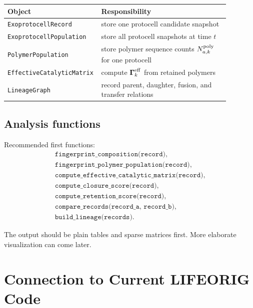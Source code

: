 \documentclass[11pt]{article}
\begin{document}
\begin{center}
\small
\begin{tabular}{p{0.30\linewidth}p{0.58\linewidth}}
\toprule
Object & Responsibility \\
\midrule
\texttt{ExoprotocellRecord} & store one protocell candidate snapshot \\
\texttt{ExoprotocellPopulation} & store all protocell snapshots at time $t$ \\
\texttt{PolymerPopulation} & store polymer sequence counts $N^{\rm poly}_{a,k}$ for one protocell \\
\texttt{EffectiveCatalyticMatrix} & compute $\boldsymbol{\Gamma}^{\rm eff}_k$ from retained polymers \\
\texttt{LineageGraph} & record parent, daughter, fusion, and transfer relations \\
\bottomrule
\end{tabular}
\end{center}

\subsection{Analysis functions}

Recommended first functions:
\begin{equation}
\begin{gathered}
\texttt{fingerprint\_composition(record)},\\
\texttt{fingerprint\_polymer\_population(record)},\\
\texttt{compute\_effective\_catalytic\_matrix(record)},\\
\texttt{compute\_closure\_score(record)},\\
\texttt{compute\_retention\_score(record)},\\
\texttt{compare\_records(record\_a, record\_b)},\\
\texttt{build\_lineage(records)}.
\end{gathered}
\end{equation}

The output should be plain tables and sparse matrices first. More elaborate visualization can come later.

\section{Connection to Current LIFEORIG Code}
\end{document}
